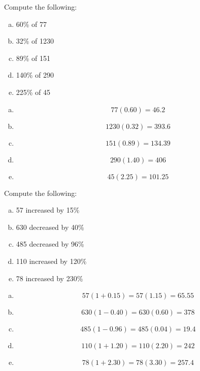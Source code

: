 \documentclass[11pt,letterpaper]{article}
\begin{document}

 Compute the following:
\begin{enumerate}[(a)]
\item 60\% of 77
\item 32\% of 1230
\item 89\% of 151
\item 140\% of 290
\item 225\% of 45
\end{enumerate} \pspace

\sol
\begin{enumerate}[(a)]
\item 
	\[
	77(0.60)= 46.2
	\] \pspace

\item 
	\[
	1230(0.32)= 393.6
	\] \pspace

\item 
	\[
	151(0.89)= 134.39
	\] \pspace

\item 
	\[
	290(1.40)= 406
	\] \pspace

\item 
	\[
	45(2.25)= 101.25
	\]
\end{enumerate}



\newpage



 Compute the following:
\begin{enumerate}[(a)]
\item 57 increased by 15\%
\item 630 decreased by 40\%
\item 485 decreased by 96\%
\item 110 increased by 120\%
\item 78 increased by 230\%
\end{enumerate} \pspace

\sol
\begin{enumerate}[(a)]
\item 
	\[
	57(1 + 0.15)= 57(1.15)= 65.55
	\] \pspace

\item 
	\[
	630(1 - 0.40)= 630(0.60)= 378
	\] \pspace

\item 
	\[
	485(1 - 0.96)= 485(0.04)= 19.4
	\] \pspace

\item 
	\[
	110(1 + 1.20)= 110(2.20)= 242
	\] \pspace

\item 
	\[
	78(1 + 2.30)= 78(3.30)= 257.4
	\]
\end{enumerate}
\end{document}
